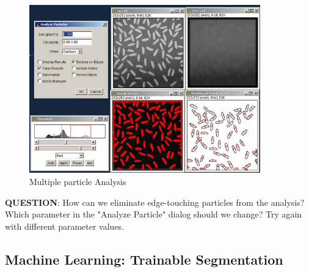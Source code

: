 \begin{indentexercise}{2}
\begin{figure}[H]
\begin{center}
\includegraphics[width=10cm]{fig/CMCIBasicCourse201102-img120.jpg}
\caption{ Multiple particle Analysis}
\label{fig:img120}
\end{center}
\end{figure}

\textbf{QUESTION}: How can we eliminate edge-touching particles from the
analysis? Which parameter in the "Analyze
Particle" dialog should we change? Try again with
different parameter values.
\end{indentexercise}

\subsection{Machine Learning: Trainable Segmentation}

